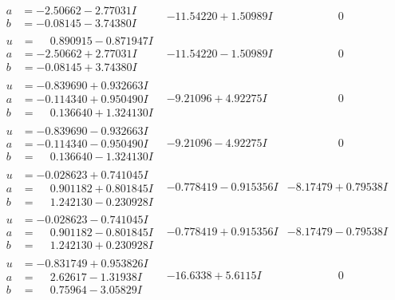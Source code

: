 \documentclass[1p]{elsarticle_modified}
\theoremstyle{definition}
\begin{document}
$$\begin{array}{c|c|c}
\begin{aligned}
a &= -2.50662 - 2.77031 I \\
b &= -0.08145 - 3.74380 I\end{aligned}
 & -11.54220 + 1.50989 I & \phantom{-0.000000 } 0 \\ \hline\begin{aligned}
u &= \phantom{-}0.890915 - 0.871947 I \\
a &= -2.50662 + 2.77031 I \\
b &= -0.08145 + 3.74380 I\end{aligned}
 & -11.54220 - 1.50989 I & \phantom{-0.000000 } 0 \\ \hline\begin{aligned}
u &= -0.839690 + 0.932663 I \\
a &= -0.114340 + 0.950490 I \\
b &= \phantom{-}0.136640 + 1.324130 I\end{aligned}
 & -9.21096 + 4.92275 I & \phantom{-0.000000 } 0 \\ \hline\begin{aligned}
u &= -0.839690 - 0.932663 I \\
a &= -0.114340 - 0.950490 I \\
b &= \phantom{-}0.136640 - 1.324130 I\end{aligned}
 & -9.21096 - 4.92275 I & \phantom{-0.000000 } 0 \\ \hline\begin{aligned}
u &= -0.028623 + 0.741045 I \\
a &= \phantom{-}0.901182 + 0.801845 I \\
b &= \phantom{-}1.242130 - 0.230928 I\end{aligned}
 & -0.778419 - 0.915356 I & -8.17479 + 0.79538 I \\ \hline\begin{aligned}
u &= -0.028623 - 0.741045 I \\
a &= \phantom{-}0.901182 - 0.801845 I \\
b &= \phantom{-}1.242130 + 0.230928 I\end{aligned}
 & -0.778419 + 0.915356 I & -8.17479 - 0.79538 I \\ \hline\begin{aligned}
u &= -0.831749 + 0.953826 I \\
a &= \phantom{-}2.62617 - 1.31938 I \\
b &= \phantom{-}0.75964 - 3.05829 I\end{aligned}
 & -16.6338 + 5.6115 I & \phantom{-0.000000 } 0 \\ \hline\begin{aligned}

\end{aligned}
\end{array}$$
\end{document}
